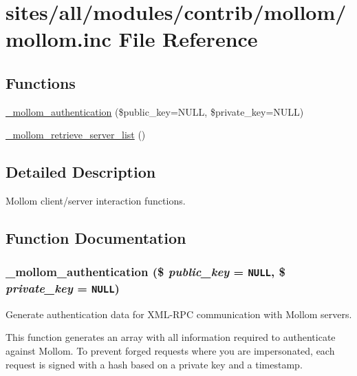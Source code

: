 \hypertarget{mollom_8inc}{
\section{sites/all/modules/contrib/mollom/mollom.inc File Reference}
\label{mollom_8inc}
}
\subsection*{Functions}
\begin{CompactItemize}
\item 
\hyperlink{mollom_8inc_027317b9bb44de2770544cec20ef8b5a}{\_\-mollom\_\-authentication} (\$public\_\-key=NULL, \$private\_\-key=NULL)
\item 
\hyperlink{mollom_8inc_bbc5f0df68f47e7a174c955e127c7489}{\_\-mollom\_\-retrieve\_\-server\_\-list} ()
\end{CompactItemize}


\subsection{Detailed Description}
Mollom client/server interaction functions. 

\subsection{Function Documentation}
\hypertarget{mollom_8inc_027317b9bb44de2770544cec20ef8b5a}{
\subsubsection[{\_\-mollom\_\-authentication}]{\setlength{\rightskip}{0pt plus 5cm}\_\-mollom\_\-authentication (\$ {\em public\_\-key} = {\tt NULL}, \/  \$ {\em private\_\-key} = {\tt NULL})}}
\label{mollom_8inc_027317b9bb44de2770544cec20ef8b5a}


Generate authentication data for XML-RPC communication with Mollom servers.

This function generates an array with all information required to authenticate against Mollom. To prevent forged requests where you are impersonated, each request is signed with a hash based on a private key and a timestamp.

